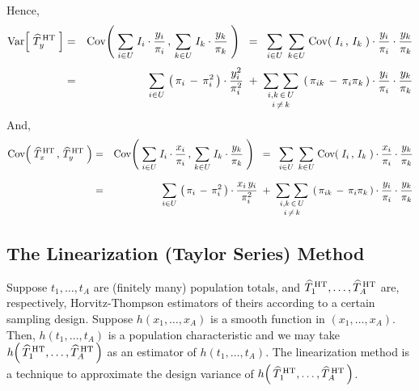 \noindent
Hence,
\begin{eqnarray*}
\Var\!\left[\;\widehat{T}^{\,\textnormal{HT}}_{y}\;\right]
& = &
	\Cov\!\left(\;
		\underset{i \in U}{\sum}\; I_{i}\cdot\dfrac{y_{i}}{\pi_{i}}
		\,,\,
		\underset{k \in U}{\sum}\; I_{k}\cdot\dfrac{y_{k}}{\pi_{k}}
		\;\right)
\;\; = \;\;
	\underset{i \in U}{\sum}\;\,
	\underset{k \in U}{\sum}\;
		\Cov\!\left(\;I_{i}\,,\,I_{k}\;\right)
		\cdot\dfrac{y_{i}}{\pi_{i}}
		\cdot\dfrac{y_{k}}{\pi_{k}}
\\
& = &
	\overset{{\color{white}1}}{\underset{i \in U}{\sum}}\,
		\left(\,\pi_{i}\,-\,\pi_{i}^{2}\,\right) \cdot \dfrac{y_{i}^{2}}{\pi_{i}^{2}}
	\; + \;
	\underset{i \, \neq \, k}{\underset{i , k \,\in\,U}{\sum\,\sum}}\;
		\left(\,\pi_{ik} \, - \, \pi_{i}\pi_{k}\,\right)
		\cdot\dfrac{y_{i}}{\pi_{i}}
		\cdot\dfrac{y_{k}}{\pi_{k}}
\end{eqnarray*}
And,
\begin{eqnarray*}
\Cov\!\left(\;
	\widehat{T}^{\,\textnormal{HT}}_{x}
	\,,\,
	\widehat{T}^{\,\textnormal{HT}}_{y}
	\;\right)
& = &
	\Cov\!\left(\;
		\underset{i \in U}{\sum}\; I_{i}\cdot\dfrac{x_{i}}{\pi_{i}}
		\,,\,
		\underset{k \in U}{\sum}\; I_{k}\cdot\dfrac{y_{k}}{\pi_{k}}
		\;\right)
\;\; = \;\;
	\underset{i \in U}{\sum}\;\,
	\underset{k \in U}{\sum}\;
		\Cov\!\left(\;I_{i}\,,\,I_{k}\;\right)
		\cdot\dfrac{x_{i}}{\pi_{i}}
		\cdot\dfrac{y_{k}}{\pi_{k}}
\\
& = &
	\overset{{\color{white}1}}{\underset{i \in U}{\sum}}\,
		\left(\,\pi_{i}\,-\,\pi_{i}^{2}\,\right) \cdot \dfrac{x_{i}\,y_{i}}{\pi_{i}^{2}}
	\; + \;
	\underset{i \, \neq \, k}{\underset{i , k \,\in\,U}{\sum\,\sum}}\;
		\left(\,\pi_{ik} \, - \, \pi_{i}\pi_{k}\,\right)
		\cdot\dfrac{y_{i}}{\pi_{i}}
		\cdot\dfrac{y_{k}}{\pi_{k}}
\end{eqnarray*}


\subsection{The Linearization (Taylor Series) Method}

\vskip 0.5cm

Suppose $t_{1}, \ldots, t_{A}$ are (finitely many) population totals, and
$\widehat{T}^{\,\textnormal{HT}}_{1}, \ldots, \widehat{T}^{\,\textnormal{HT}}_{A}$
are, respectively, Horvitz-Thompson estimators of theirs according to a certain sampling design.
Suppose $h(x_{1},\ldots,x_{A})$ is a smooth function in $(x_{1},\ldots,x_{A})$.
Then, $h(t_{1},\ldots,t_{A})$ is a population characteristic and we may take
$h\!\left(\,\widehat{T}^{\,\textnormal{HT}}_{1}, \ldots, \widehat{T}^{\,\textnormal{HT}}_{A}\,\right)$
as an estimator of $h(t_{1},\ldots,t_{A})$.
The linearization method is a technique to approximate the design variance of
$h\!\left(\,\widehat{T}^{\,\textnormal{HT}}_{1}, \ldots, \widehat{T}^{\,\textnormal{HT}}_{A}\,\right)$.

